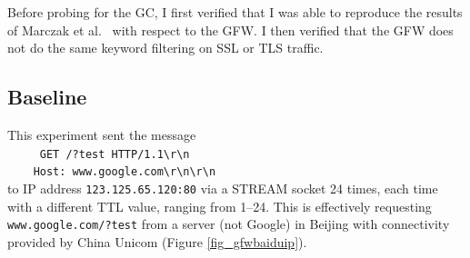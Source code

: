 Before probing for the GC, I first verified that I was able to reproduce the results of Marczak et al.~\cite{Marczak2015} with respect to the GFW.
I then verified that the GFW does not do the same keyword filtering on SSL or TLS traffic.
\subsection{Baseline}\label{gfwbaseline}
This experiment sent the message\\
\texttt{
	\-\ \ \ \ GET /?test HTTP/1.1\textbackslash{}r\textbackslash{}n\\
	\-\ \ \ \ Host: www.google.com\textbackslash{}r\textbackslash{}n\textbackslash{}r\textbackslash{}n\\
}
to IP address \texttt{123.125.65.120:80} via a STREAM socket 24 times, each time with a different TTL value, ranging from 1--24.
This is effectively requesting \texttt{www.google.com/?test} from a server (not Google) in Beijing with connectivity provided by China Unicom (Figure \ref{fig_gfwbaiduip}).
